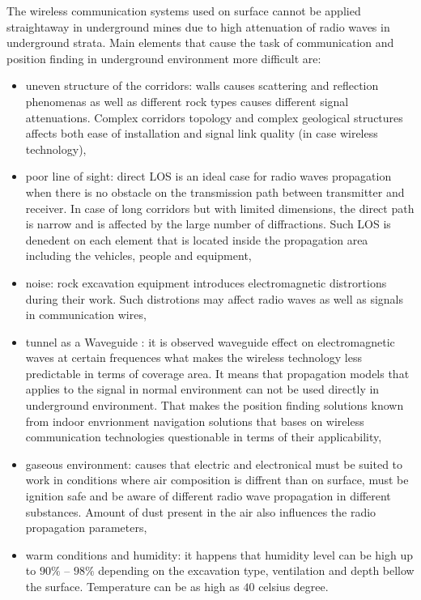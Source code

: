 \documentclass[../main.tex]{subfiles}
\begin{document}
The wireless communication systems used on surface cannot be applied straightaway in underground mines due to high attenuation of radio waves in underground strata. Main elements that cause the task of communication and position finding in underground environment more difficult are\cite{article_mine_communications_3_characteristics}:
\begin{itemize}
	\item uneven structure of the corridors: walls causes scattering and reflection phenomenas as well as different rock types causes different signal attenuations. Complex corridors topology and complex geological structures affects both ease of installation and signal link quality (in case wireless technology),
	\item poor line of sight: direct LOS is an ideal case for radio waves propagation when there is no obstacle on the transmission path between transmitter and receiver. In case of long corridors but with limited dimensions, the direct path is narrow and is affected by the large number of diffractions. Such LOS is denedent on each element that is located inside the propagation area including the vehicles, people and equipment,
	\item noise: rock excavation equipment introduces electromagnetic distrortions during their work. Such distrotions may affect radio waves as well as signals in  communication wires,
	\item tunnel as a Waveguide \cite{rf_in_tunnel_waveguide_effect}: it is observed waveguide effect on electromagnetic waves at certain frequences what makes the wireless technology less predictable in terms of coverage area. It means that propagation models that applies to the signal in normal environment can not be used directly in underground environment. That makes the position finding solutions known from indoor envrionment navigation solutions that bases on wireless communication technologies questionable in terms of their applicability,
	\item gaseous environment: causes that electric and electronical must be suited to work in conditions where air composition is diffrent than on surface, must be ignition safe and be aware of different radio wave propagation in different substances. Amount of dust present in the air also influences the radio propagation parameters,
	\item warm conditions and humidity: it happens that humidity level can be high up to $90\%$ -- $98\%$ depending on the excavation type, ventilation and depth bellow the surface. Temperature can be as high as $40$ celsius degree.
\end{itemize}
\end{document}
